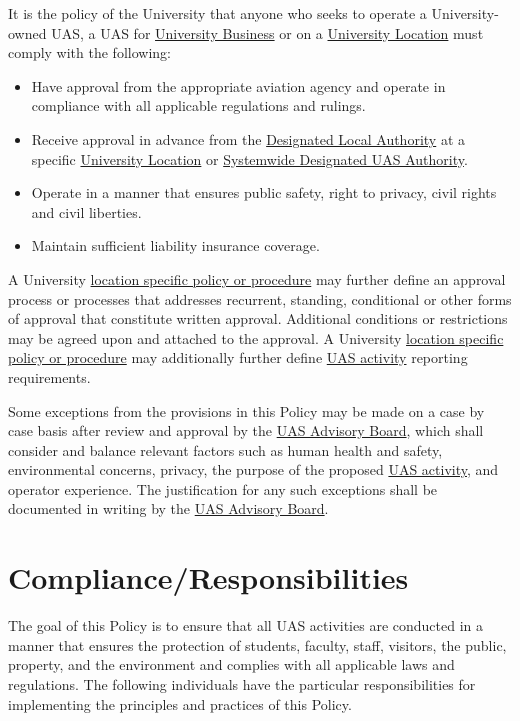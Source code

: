 \documentclass[
]{book}
\providecommand{\tightlist}{%
  \setlength{\itemsep}{0pt}\setlength{\parskip}{0pt}}
\begin{document}
It is the policy of the University that anyone who seeks to operate a University-owned UAS, a UAS for \protect\hyperlink{UB}{University Business} or on a \protect\hyperlink{UL}{University Location} must comply with the following:

\begin{itemize}
\tightlist
\item
  Have approval from the appropriate aviation agency and operate in compliance with all applicable regulations and rulings.
\item
  Receive approval in advance from the \protect\hyperlink{DLA}{Designated Local Authority} at a specific \protect\hyperlink{UL}{University Location} or \protect\hyperlink{SDA}{Systemwide Designated UAS Authority}.
\item
  Operate in a manner that ensures public safety, right to privacy, civil rights and civil liberties.
\item
  Maintain sufficient liability insurance coverage.
\end{itemize}

A University \protect\hyperlink{LSP}{location specific policy or procedure} may further define an approval process or processes that addresses recurrent, standing, conditional or other forms of approval that constitute written approval. Additional conditions or restrictions may be agreed upon and attached to the approval. A University \protect\hyperlink{LSP}{location specific policy or procedure} may additionally further define \protect\hyperlink{UASactivity}{UAS activity} reporting requirements.

Some exceptions from the provisions in this Policy may be made on a case by case basis after review and approval by the \protect\hyperlink{AB}{UAS Advisory Board}, which shall consider and balance relevant factors such as human health and safety, environmental concerns, privacy, the purpose of the proposed \protect\hyperlink{UASactivity}{UAS activity}, and operator experience. The justification for any such exceptions shall be documented in writing by the \protect\hyperlink{AB}{UAS Advisory Board}.

\hypertarget{complianceresponsibilities}{%
\section{Compliance/Responsibilities}\label{complianceresponsibilities}}

The goal of this Policy is to ensure that all UAS activities are conducted in a manner that ensures the protection of students, faculty, staff, visitors, the public, property, and the environment and complies with all applicable laws and regulations.
The following individuals have the particular responsibilities for implementing the principles and practices of this Policy.
\end{document}

